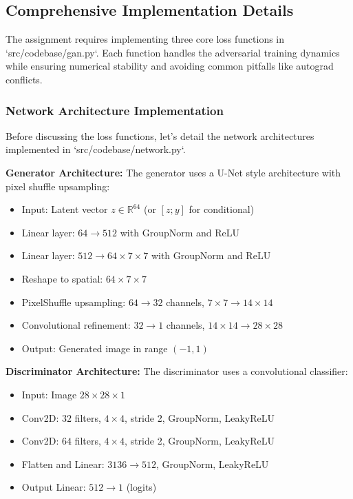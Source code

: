 \documentclass{article}
\begin{document}
\subsection{Comprehensive Implementation Details}

The assignment requires implementing three core loss functions in `src/codebase/gan.py`. Each function handles the adversarial training dynamics while ensuring numerical stability and avoiding common pitfalls like autograd conflicts.

\subsubsection{Network Architecture Implementation}

Before discussing the loss functions, let's detail the network architectures implemented in `src/codebase/network.py`.

\textbf{Generator Architecture:} The generator uses a U-Net style architecture with pixel shuffle upsampling:
\begin{itemize}
  \item Input: Latent vector $z \in \mathbb{R}^{64}$ (or $[z; y]$ for conditional)
  \item Linear layer: $64 \to 512$ with GroupNorm and ReLU
  \item Linear layer: $512 \to 64 \times 7 \times 7$ with GroupNorm and ReLU
  \item Reshape to spatial: $64 \times 7 \times 7$
  \item PixelShuffle upsampling: $64 \to 32$ channels, $7 \times 7 \to 14 \times 14$
  \item Convolutional refinement: $32 \to 1$ channels, $14 \times 14 \to 28 \times 28$
  \item Output: Generated image in range $(-1, 1)$
\end{itemize}

\textbf{Discriminator Architecture:} The discriminator uses a convolutional classifier:
\begin{itemize}
  \item Input: Image $28 \times 28 \times 1$
  \item Conv2D: $32$ filters, $4 \times 4$, stride 2, GroupNorm, LeakyReLU
  \item Conv2D: $64$ filters, $4 \times 4$, stride 2, GroupNorm, LeakyReLU
  \item Flatten and Linear: $3136 \to 512$, GroupNorm, LeakyReLU
  \item Output Linear: $512 \to 1$ (logits)
\end{itemize}
\end{document}

